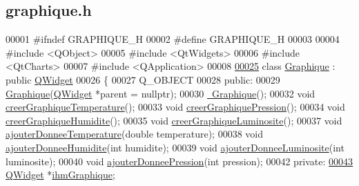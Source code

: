 \hypertarget{graphique_8h_source}{}\subsection{graphique.\+h}
\label{graphique_8h_source}

\begin{DoxyCode}
00001 \textcolor{preprocessor}{#ifndef GRAPHIQUE\_H}
00002 \textcolor{preprocessor}{#define GRAPHIQUE\_H}
00003 
00004 \textcolor{preprocessor}{#include <QObject>}
00005 \textcolor{preprocessor}{#include <QtWidgets>}
00006 \textcolor{preprocessor}{#include <QtCharts>}
00007 \textcolor{preprocessor}{#include <QApplication>}
00008 
\hypertarget{graphique_8h_source.tex_l00025}{}\hyperlink{class_graphique}{00025} \textcolor{keyword}{class }\hyperlink{class_graphique}{Graphique} : \textcolor{keyword}{public} \hyperlink{class_q_widget}{QWidget}
00026 \{
00027     Q\_OBJECT
00028 \textcolor{keyword}{public}:
00029     \hyperlink{class_graphique_a3aec0a5aaae78f0726771dea67af69b4}{Graphique}(\hyperlink{class_q_widget}{QWidget} *parent = \textcolor{keyword}{nullptr});     
00030     \hyperlink{class_graphique_a1bb866eb859b961cf0cdddc1b289a773}{~Graphique}();                       
00032     \textcolor{keywordtype}{void} \hyperlink{class_graphique_ad9b976804bafcbfe451d89fd35729d16}{creerGraphiqueTemperature}();       
00033     \textcolor{keywordtype}{void} \hyperlink{class_graphique_adc50b5ae7a54dd576c99e74ec6bf74c5}{creerGraphiquePression}();       
00034     \textcolor{keywordtype}{void} \hyperlink{class_graphique_a19d6deef2d11e95093a343d49f75d14e}{creerGraphiqueHumidite}();       
00035     \textcolor{keywordtype}{void} \hyperlink{class_graphique_a3b55b9c4732856e1b25bef167c25ac4c}{creerGraphiqueLuminosite}();       
00037     \textcolor{keywordtype}{void} \hyperlink{class_graphique_a42b3c986ca86c426adbb8fdb03a04380}{ajouterDonneeTemperature}(\textcolor{keywordtype}{double} temperature);         
00038     \textcolor{keywordtype}{void} \hyperlink{class_graphique_ad3dd36f05a9923054a0a2138f96f0311}{ajouterDonneeHumidite}(\textcolor{keywordtype}{int} humidite);         
00039     \textcolor{keywordtype}{void} \hyperlink{class_graphique_a1af0e1968998cb7b5ee8add1197cb0e0}{ajouterDonneeLuminosite}(\textcolor{keywordtype}{int} luminosite);         
00040     \textcolor{keywordtype}{void} \hyperlink{class_graphique_a289f0631e56465012511fd7ec9da1b23}{ajouterDonneePression}(\textcolor{keywordtype}{int} pression);         
00042 \textcolor{keyword}{private}:
\hypertarget{graphique_8h_source.tex_l00043}{}\hyperlink{class_graphique_a55d98b20085f7c79f42f3ae0423ac72a}{00043}     \hyperlink{class_q_widget}{QWidget} *\hyperlink{class_graphique_a55d98b20085f7c79f42f3ae0423ac72a}{ihmGraphique};  

\end{DoxyCode}
